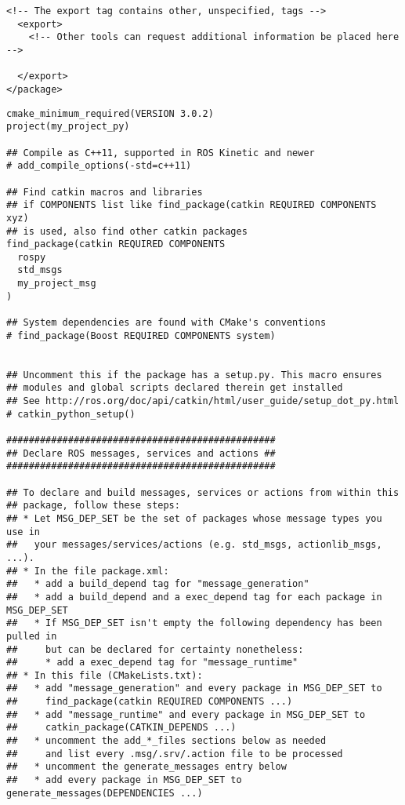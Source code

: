 \documentclass[letterpaper]{article}
\begin{document}
\begin{lstlisting}[style=mystyle, title=src/my\_project\_py/package.xml]
  <!-- The export tag contains other, unspecified, tags -->
  <export>
    <!-- Other tools can request additional information be placed here -->

  </export>
</package>

\end{lstlisting}
\begin{lstlisting}[style=mystyle, title=src/my\_project\_py/CMakeLists.txt]
cmake_minimum_required(VERSION 3.0.2)
project(my_project_py)

## Compile as C++11, supported in ROS Kinetic and newer
# add_compile_options(-std=c++11)

## Find catkin macros and libraries
## if COMPONENTS list like find_package(catkin REQUIRED COMPONENTS xyz)
## is used, also find other catkin packages
find_package(catkin REQUIRED COMPONENTS
  rospy
  std_msgs
  my_project_msg
)

## System dependencies are found with CMake's conventions
# find_package(Boost REQUIRED COMPONENTS system)


## Uncomment this if the package has a setup.py. This macro ensures
## modules and global scripts declared therein get installed
## See http://ros.org/doc/api/catkin/html/user_guide/setup_dot_py.html
# catkin_python_setup()

################################################
## Declare ROS messages, services and actions ##
################################################

## To declare and build messages, services or actions from within this
## package, follow these steps:
## * Let MSG_DEP_SET be the set of packages whose message types you use in
##   your messages/services/actions (e.g. std_msgs, actionlib_msgs, ...).
## * In the file package.xml:
##   * add a build_depend tag for "message_generation"
##   * add a build_depend and a exec_depend tag for each package in MSG_DEP_SET
##   * If MSG_DEP_SET isn't empty the following dependency has been pulled in
##     but can be declared for certainty nonetheless:
##     * add a exec_depend tag for "message_runtime"
## * In this file (CMakeLists.txt):
##   * add "message_generation" and every package in MSG_DEP_SET to
##     find_package(catkin REQUIRED COMPONENTS ...)
##   * add "message_runtime" and every package in MSG_DEP_SET to
##     catkin_package(CATKIN_DEPENDS ...)
##   * uncomment the add_*_files sections below as needed
##     and list every .msg/.srv/.action file to be processed
##   * uncomment the generate_messages entry below
##   * add every package in MSG_DEP_SET to generate_messages(DEPENDENCIES ...)


\end{lstlisting}
\end{document}
